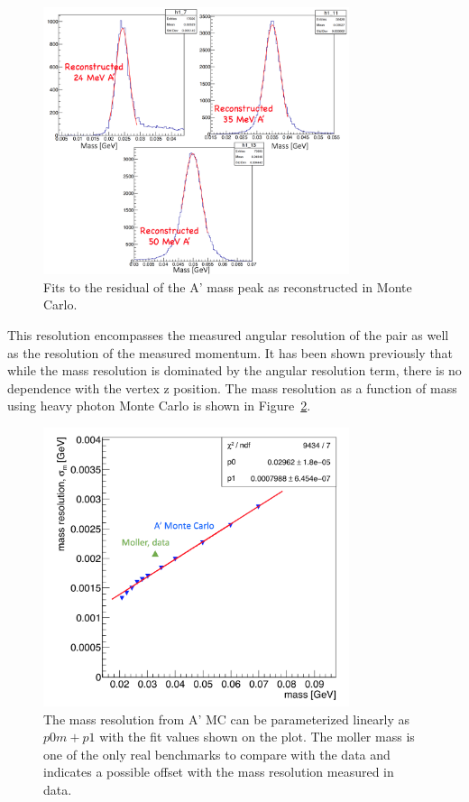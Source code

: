 \documentclass[twoside]{article}
\begin{document}
\begin{figure}[H]
  \centering
     \includegraphics[width=0.8\textwidth]{plots/L1L1MassFit.png}
  \caption{Fits to the residual of the A' mass peak as reconstructed in Monte Carlo.}
  \label{fig:l1l1_mfits}
\end{figure} 

This resolution encompasses the measured angular resolution of the pair as well as the resolution of the measured momentum. It has been shown previously that while the mass resolution is dominated by the angular resolution term, there is no dependence with the vertex z position. The mass resolution as a function of mass using heavy photon Monte Carlo is shown in Figure~\ref{fig:massRes_L1L1}.


\begin{figure}[H]
  \centering
     \includegraphics[width=0.8\textwidth]{plots/massRes_L1L1.png}
  \caption{The mass resolution from A' MC can be parameterized linearly as $p0m+p1$ with the fit values shown on the plot. The moller mass is one of the only real benchmarks to compare with the data and indicates a possible offset with the mass resolution measured in data. }
  \label{fig:massRes_L1L1}
\end{figure} 
\end{document}
